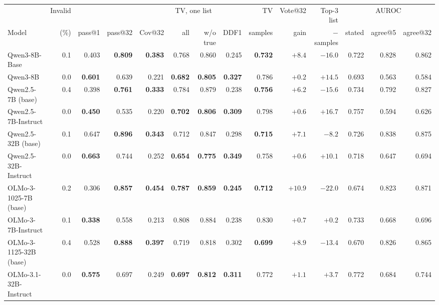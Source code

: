 \documentclass[11pt]{article}
\begin{document}
\begin{table}[t]
\centering
\begin{adjustbox}{max width=\textwidth}
\begin{tabular}{lrrrrrrrrrrrrr}
\toprule
 & Invalid & & & & \multicolumn{2}{c}{TV, one list} & & TV & Vote@32 & Top-3 list & \multicolumn{3}{c}{AUROC} \\
Model & (\%) & pass@1 & pass@32 & Cov@32 & all & w/o true & DDF1 & samples & gain & $-$ samples & stated & agree@5 & agree@32 \\
\midrule
Qwen3-8B-Base & 0.1 & 0.403 & \textbf{0.809} & \textbf{0.383} & 0.768 & 0.860 & 0.245 & \textbf{0.732} & $+8.4$ & $-16.0$ & 0.722 & 0.828 & 0.862 \\
Qwen3-8B & 0.0 & \textbf{0.601} & 0.639 & 0.221 & \textbf{0.682} & \textbf{0.805} & \textbf{0.327} & 0.786 & $+0.2$ & $+14.5$ & 0.693 & 0.563 & 0.584 \\
\midrule
Qwen2.5-7B (base) & 0.4 & 0.398 & \textbf{0.761} & \textbf{0.333} & 0.784 & 0.879 & 0.238 & \textbf{0.756} & $+6.2$ & $-15.6$ & 0.734 & 0.792 & 0.827 \\
Qwen2.5-7B-Instruct & 0.0 & \textbf{0.450} & 0.535 & 0.220 & \textbf{0.702} & \textbf{0.806} & \textbf{0.309} & 0.798 & $+0.6$ & $+16.7$ & 0.757 & 0.594 & 0.626 \\
\midrule
Qwen2.5-32B (base) & 0.1 & 0.647 & \textbf{0.896} & \textbf{0.343} & 0.712 & 0.847 & 0.298 & \textbf{0.715} & $+7.1$ & $-8.2$ & 0.726 & 0.838 & 0.875 \\
Qwen2.5-32B-Instruct & 0.0 & \textbf{0.663} & 0.744 & 0.252 & \textbf{0.654} & \textbf{0.775} & \textbf{0.349} & 0.758 & $+0.6$ & $+10.1$ & 0.718 & 0.647 & 0.694 \\
\midrule
OLMo-3-1025-7B (base) & 0.2 & 0.306 & \textbf{0.857} & \textbf{0.454} & \textbf{0.787} & \textbf{0.859} & \textbf{0.245} & \textbf{0.712} & $+10.9$ & $-22.0$ & 0.674 & 0.823 & 0.871 \\
OLMo-3-7B-Instruct & 0.1 & \textbf{0.338} & 0.558 & 0.213 & 0.808 & 0.884 & 0.238 & 0.830 & $+0.7$ & $+0.2$ & 0.733 & 0.668 & 0.696 \\
\midrule
OLMo-3-1125-32B (base) & 0.4 & 0.528 & \textbf{0.888} & \textbf{0.397} & 0.719 & 0.818 & 0.302 & \textbf{0.699} & $+8.9$ & $-13.4$ & 0.670 & 0.826 & 0.865 \\
OLMo-3.1-32B-Instruct & 0.0 & \textbf{0.575} & 0.697 & 0.249 & \textbf{0.697} & \textbf{0.812} & \textbf{0.311} & 0.772 & $+1.1$ & $+3.7$ & 0.772 & 0.684 & 0.744 \\
\bottomrule
\end{tabular}

\end{adjustbox}
\end{table}
\end{document}
